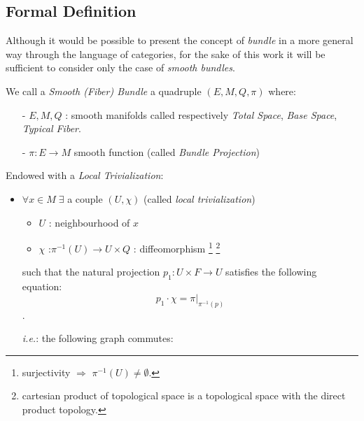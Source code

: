 \documentclass[Main]{subfiles}
\begin{document}
		\subsection{Formal Definition}
			Although it would be possible to present the concept of \emph{bundle} in a more general way through the language of categories, for the sake of this work it will be sufficient to consider only the case of \emph{smooth bundles}.
			\begin{definition}\label{Def:SmoothBundle}
				We call a \emph{Smooth (Fiber) Bundle}  a quadruple $(E,M,Q,\pi)$ where:
				\begin{itemize}
					\item[-] $E,M,Q$ :  smooth manifolds called respectively \emph{Total Space}, \emph{Base Space}, \emph{Typical Fiber}.
					\item[-] $\pi : E \rightarrow M $ smooth function (called \emph{Bundle Projection})
				\end{itemize}
				Endowed with a \emph{Local Trivialization}:
				\begin{itemize}
					\item $\forall x \in M \; \exists$ a couple $(U, \chi)$ (called \emph{local trivialization})
					\begin{itemize}
						\item $U$ : neighbourhood of $x$
						\item $\chi$ :$\pi^{-1}(U) \rightarrow U \times Q$ : diffeomorphism
 							\footnote{surjectivity $\Rightarrow$ $\pi^{-1}(U) \neq \emptyset$.} 
 							\footnote{cartesian product of topological space is a topological space with the direct product topology.}
					\end{itemize}
					such that the natural projection $p_1 : U \times F \rightarrow U$ satisfies the following equation: $$p_1 \cdot \chi = \pi \vert_{\pi^{-1}(p)}$$.

					\textit{i.e.}: the following graph commutes:
					

				\end{itemize}
			\end{definition}
\end{document}
